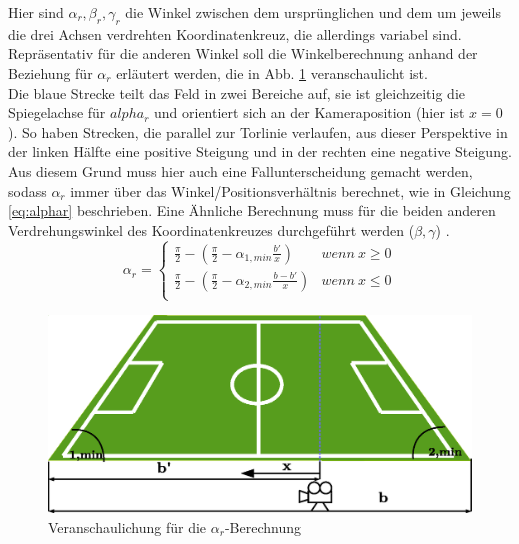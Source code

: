 \documentclass{ezb}
\begin{document}
\linebreak
Hier sind $\alpha_{r}, \beta_{r}, \gamma_{r}$ die Winkel zwischen dem ursprünglichen und dem um jeweils die drei Achsen verdrehten Koordinatenkreuz, die allerdings variabel sind. Repräsentativ für die anderen Winkel soll die Winkelberechnung anhand der Beziehung für $\alpha_{r}$ erläutert werden, die in Abb. \ref{abb:alpharBerechnung} veranschaulicht ist.\\
\linebreak
Die blaue Strecke teilt das Feld in zwei Bereiche auf, sie ist gleichzeitig die Spiegelachse für $alpha_{r}$ und orientiert sich an der Kameraposition (hier ist $x=0$). So haben Strecken, die parallel zur Torlinie verlaufen, aus dieser Perspektive in der linken Hälfte eine positive Steigung und in der rechten eine negative Steigung. Aus diesem Grund muss hier auch eine Fallunterscheidung gemacht werden, sodass $\alpha_{r}$ immer über das Winkel/Positionsverhältnis berechnet, wie in Gleichung \ref{eq:alphar} beschrieben. Eine Ähnliche Berechnung muss für die beiden anderen Verdrehungswinkel des Koordinatenkreuzes durchgeführt werden ($ \beta , \gamma$) 
.
\begin{equation}
\alpha_{r} = 
\begin{cases}
	\frac{\pi}{2} - (\frac{\pi}{2}-\alpha_{1,min}\frac{b'}{x}) & wenn \ x\geq 0  \\
    \frac{\pi}{2} - (\frac{\pi}{2}-\alpha_{2,min}\frac{b-b'}{x}) & wenn \ x\leq 0 \\
\end{cases}
\label{eq:alphar}
\end{equation}
\begin{figure}[!h]
\centering
\includegraphics[scale=0.6]{./ar.eps}
\caption{Veranschaulichung für die $\alpha_{r}$-Berechnung}
\label{abb:alpharBerechnung}
\end{figure}
\end{document}
